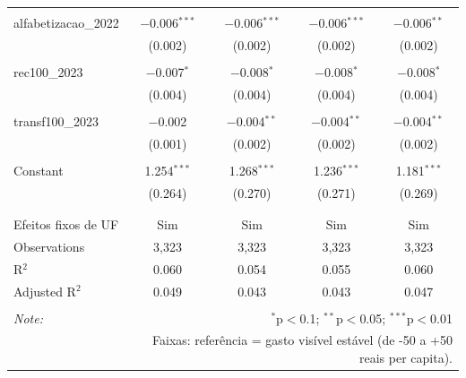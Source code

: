 \begin{table}[!htbp]
\begin{tabular}{@{\extracolsep{5pt}}lcccc}
  & & & & \\ 
 alfabetizacao\_2022 & $-$0.006$^{***}$ & $-$0.006$^{***}$ & $-$0.006$^{***}$ & $-$0.006$^{**}$ \\ 
  & (0.002) & (0.002) & (0.002) & (0.002) \\ 
  & & & & \\ 
 rec100\_2023 & $-$0.007$^{*}$ & $-$0.008$^{*}$ & $-$0.008$^{*}$ & $-$0.008$^{*}$ \\ 
  & (0.004) & (0.004) & (0.004) & (0.004) \\ 
  & & & & \\ 
 transf100\_2023 & $-$0.002 & $-$0.004$^{**}$ & $-$0.004$^{**}$ & $-$0.004$^{**}$ \\ 
  & (0.001) & (0.002) & (0.002) & (0.002) \\ 
  & & & & \\ 
 Constant & 1.254$^{***}$ & 1.268$^{***}$ & 1.236$^{***}$ & 1.181$^{***}$ \\ 
  & (0.264) & (0.270) & (0.271) & (0.269) \\ 
  & & & & \\ 
\hline \\[-1.8ex] 
Efeitos fixos de UF & Sim & Sim & Sim & Sim \\ 
Observations & 3,323 & 3,323 & 3,323 & 3,323 \\ 
R$^{2}$ & 0.060 & 0.054 & 0.055 & 0.060 \\ 
Adjusted R$^{2}$ & 0.049 & 0.043 & 0.043 & 0.047 \\ 
\hline 
\hline \\[-1.8ex] 
\textit{Note:}  & \multicolumn{4}{r}{$^{*}$p$<$0.1; $^{**}$p$<$0.05; $^{***}$p$<$0.01} \\ 
 & \multicolumn{4}{r}{Faixas: referência = gasto visível estável (de -50 a +50 reais per capita).} \\ 
\end{tabular} 
\end{table} 
